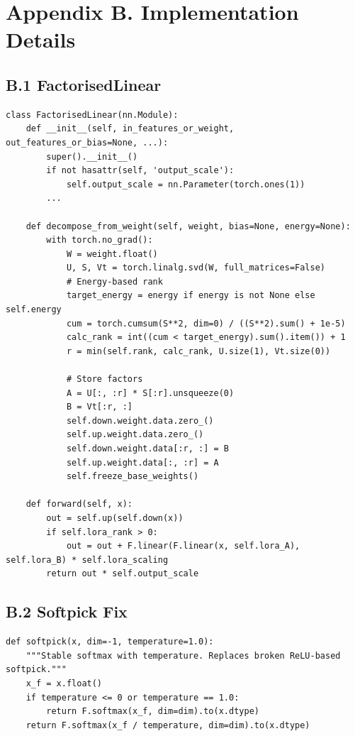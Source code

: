 \section{Appendix B. Implementation Details}

\subsection{B.1 FactorisedLinear}

\begin{lstlisting}
class FactorisedLinear(nn.Module):
    def __init__(self, in_features_or_weight, out_features_or_bias=None, ...):
        super().__init__()
        if not hasattr(self, 'output_scale'):
            self.output_scale = nn.Parameter(torch.ones(1))
        ...
    
    def decompose_from_weight(self, weight, bias=None, energy=None):
        with torch.no_grad():
            W = weight.float()
            U, S, Vt = torch.linalg.svd(W, full_matrices=False)
            # Energy-based rank
            target_energy = energy if energy is not None else self.energy
            cum = torch.cumsum(S**2, dim=0) / ((S**2).sum() + 1e-5)
            calc_rank = int((cum < target_energy).sum().item()) + 1
            r = min(self.rank, calc_rank, U.size(1), Vt.size(0))
            
            # Store factors
            A = U[:, :r] * S[:r].unsqueeze(0)
            B = Vt[:r, :]
            self.down.weight.data.zero_()
            self.up.weight.data.zero_()
            self.down.weight.data[:r, :] = B
            self.up.weight.data[:, :r] = A
            self.freeze_base_weights()
    
    def forward(self, x):
        out = self.up(self.down(x))
        if self.lora_rank > 0:
            out = out + F.linear(F.linear(x, self.lora_A), self.lora_B) * self.lora_scaling
        return out * self.output_scale
\end{lstlisting}

\subsection{B.2 Softpick Fix}

\begin{lstlisting}
def softpick(x, dim=-1, temperature=1.0):
    """Stable softmax with temperature. Replaces broken ReLU-based softpick."""
    x_f = x.float()
    if temperature <= 0 or temperature == 1.0:
        return F.softmax(x_f, dim=dim).to(x.dtype)
    return F.softmax(x_f / temperature, dim=dim).to(x.dtype)
\end{lstlisting}

